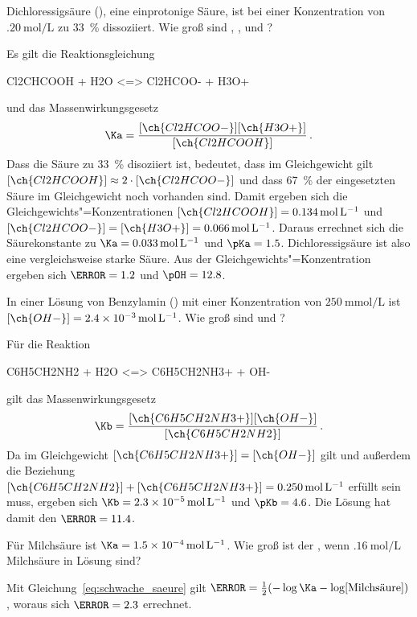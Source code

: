 \documentclass{arbeitsblatt}
\begin{document}
\begin{question}
  Dichloressigsäure (), eine einprotonige Säure, ist bei einer
  Konzentration von $\SI{.20}{\mole\per\liter}$ zu \SI{33}{\percent}
  dissoziiert.  Wie groß sind \Ka, \pKa, \pH{} und \pOH?
\end{question}
\begin{solution}
  Es gilt die Reaktionsgleichung
  \begin{reaction*}
    Cl2CHCOOH + H2O <=> Cl2HCOO- + H3O+
  \end{reaction*}
  und das Massenwirkungsgesetz
  \[
    \Ka = \frac{[\ch{Cl2HCOO-}][\ch{H3O+}]}{[\ch{Cl2HCOOH}]} \,.
  \]
  Dass die Säure zu \SI{33}{\percent} disoziiert ist, bedeutet, dass
  im Gleichgewicht gilt $[\ch{Cl2HCOOH}] \approx 2\cdot[\ch{Cl2HCOO-}]$ und
  dass \SI{67}{\percent} der eingesetzten Säure im Gleichgewicht noch
  vorhanden sind.  Damit ergeben sich die Gleichgewichts"=Konzentrationen
  $[\ch{Cl2HCOOH}] = \SI{.134}{\mole\per\liter}$ und $[\ch{Cl2HCOO-}] =
  [\ch{H3O+}] = \SI{0.066}{\mole\per\liter}$.  Daraus errechnet sich die
  Säurekonstante zu $\Ka = \SI{0.033}{\mole\per\liter}$ und $\pKa = 1.5$.
  Dichloressigsäure ist also eine vergleichsweise starke Säure.  Aus der
  Gleichgewichts"=Konzentration ergeben sich $\pH = 1.2$ und $\pOH = 12.8$.
\end{solution}

\begin{question}
  In einer Lösung von Benzylamin () mit einer Konzentration von
  $\SI{250}{\milli\mole\per\liter}$ ist \([\ch{OH-}] =
  \SI{2.4e-3}{\mole\per\liter}\).  Wie groß sind \pKb{} und \pH?
\end{question}
\begin{solution}
  Für die Reaktion
  \begin{reaction*}
    C6H5CH2NH2 + H2O <=> C6H5CH2NH3+ + OH-
  \end{reaction*}
  gilt das Massenwirkungsgesetz
  \[
    \Kb = \frac{[\ch{C6H5CH2NH3+}][\ch{OH-}]}{[\ch{C6H5CH2NH2}]} \,.
  \]
  Da im Gleichgewicht $[\ch{C6H5CH2NH3+}] = [\ch{OH-}]$ gilt und außerdem die
  Beziehung $[\ch{C6H5CH2NH2}] + [\ch{C6H5CH2NH3+}] =
  \SI{0.250}{\mole\per\liter}$ erfüllt sein muss, ergeben sich $\Kb =
  \SI{2.3e-5}{\mole\per\liter}$ und $\pKb = 4.6$.  Die Lösung hat damit den
  $\pH = 11.4$.
\end{solution}

\begin{question}
  Für Milchsäure ist $\Ka = \SI{1.5e-4}{\mole\per\liter}$.  Wie groß ist der
  \pH, wenn $\SI{.16}{\mole\per\liter}$ Milchsäure in Lösung sind?
\end{question}
\begin{solution}
  Mit Gleichung~\eqref{eq:schwache_saeure} gilt $\pH = \frac{1}{2}(-\log\Ka -
  \log[\text{Milchsäure}])$, woraus sich $\pH = 2.3$ errechnet.
\end{solution}
\end{document}
